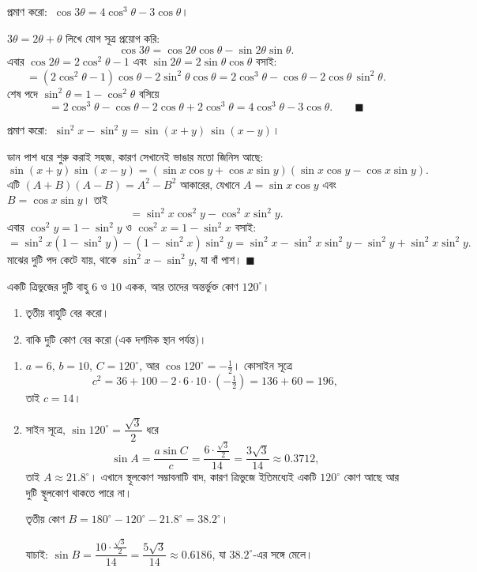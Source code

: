 \documentclass[11pt]{article}
\begin{document}
 প্রমাণ করো: $\ \cos 3\theta = 4\cos^3\theta - 3\cos\theta$।

\begin{sol}
$3\theta = 2\theta + \theta$ লিখে যোগ সূত্র প্রয়োগ করি:
\[
  \cos 3\theta = \cos 2\theta \cos\theta - \sin 2\theta \sin\theta .
\]
এবার $\cos 2\theta = 2\cos^2\theta - 1$ এবং
$\sin 2\theta = 2\sin\theta\cos\theta$ বসাই:
\[
  = (2\cos^2\theta - 1)\cos\theta - 2\sin^2\theta\cos\theta
  = 2\cos^3\theta - \cos\theta - 2\cos\theta\,\sin^2\theta .
\]
শেষ পদে $\sin^2\theta = 1 - \cos^2\theta$ বসিয়ে
\[
  = 2\cos^3\theta - \cos\theta - 2\cos\theta + 2\cos^3\theta
  = 4\cos^3\theta - 3\cos\theta . \qquad \blacksquare
\]
\end{sol}

 প্রমাণ করো:
$\ \sin^2 x - \sin^2 y = \sin(x+y)\,\sin(x-y)$।

\begin{sol}
ডান পাশ ধরে শুরু করাই সহজ, কারণ সেখানেই ভাঙার মতো জিনিস আছে:
\[
  \sin(x+y)\sin(x-y)
  = (\sin x\cos y + \cos x \sin y)(\sin x \cos y - \cos x \sin y) .
\]
এটি $(A+B)(A-B) = A^2 - B^2$ আকারের, যেখানে $A = \sin x\cos y$ এবং
$B = \cos x \sin y$। তাই
\[
  = \sin^2 x \cos^2 y - \cos^2 x \sin^2 y .
\]
এবার $\cos^2 y = 1 - \sin^2 y$ ও $\cos^2 x = 1 - \sin^2 x$ বসাই:
\[
  = \sin^2 x (1 - \sin^2 y) - (1 - \sin^2 x)\sin^2 y
  = \sin^2 x - \sin^2 x \sin^2 y - \sin^2 y + \sin^2 x \sin^2 y .
\]
মাঝের দুটি পদ কেটে যায়, থাকে $\sin^2 x - \sin^2 y$, যা বাঁ পাশ।
$\blacksquare$
\end{sol}

 একটি ত্রিভুজের দুটি বাহু $6$ ও $10$ একক, আর তাদের অন্তর্ভুক্ত কোণ
$120^\circ$।
\begin{enumerate}
  \item তৃতীয় বাহুটি বের করো।
  \item বাকি দুটি কোণ বের করো (এক দশমিক স্থান পর্যন্ত)।
\end{enumerate}

\begin{sol}
\begin{enumerate}
  \item $a = 6$, $b = 10$, $C = 120^\circ$, আর
        $\cos 120^\circ = -\tfrac{1}{2}$। কোসাইন সূত্রে
        \[
          c^2 = 36 + 100 - 2 \cdot 6 \cdot 10 \cdot \left(-\tfrac{1}{2}\right)
              = 136 + 60 = 196 ,
        \]
        তাই $c = 14$।
  \item সাইন সূত্রে, $\sin 120^\circ = \dfrac{\sqrt{3}}{2}$ ধরে
        \[
          \sin A = \frac{a \sin C}{c} = \frac{6 \cdot \frac{\sqrt{3}}{2}}{14}
                 = \frac{3\sqrt{3}}{14} \approx 0.3712 ,
        \]
        তাই $A \approx 21.8^\circ$। এখানে স্থূলকোণ সম্ভাবনাটি বাদ, কারণ
        ত্রিভুজে ইতিমধ্যেই একটি $120^\circ$ কোণ আছে আর দুটি স্থূলকোণ থাকতে
        পারে না।

        তৃতীয় কোণ $B = 180^\circ - 120^\circ - 21.8^\circ = 38.2^\circ$।

        যাচাই: $\sin B = \dfrac{10 \cdot \frac{\sqrt{3}}{2}}{14}
        = \dfrac{5\sqrt{3}}{14} \approx 0.6186$, যা $38.2^\circ$-এর সঙ্গে
        মেলে।
\end{enumerate}
\end{sol}
\end{document}

